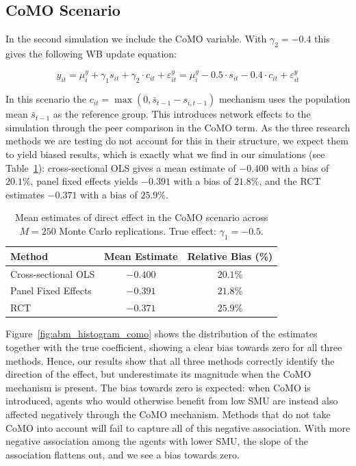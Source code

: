 \subsection{CoMO Scenario}

In the second simulation we include the CoMO variable. With $\gamma_2 = -0.4$ this gives the following WB update equation:

\begin{equation}
    y_{it} = \mu^y_i + \gamma_1 s_{it} + \gamma_2 \cdot c_{it} + \varepsilon^y_{it}
     = \mu^y_i - 0.5 \cdot s_{it} - 0.4 \cdot c_{it} + \varepsilon^y_{it}
    \label{eq:wb_como}
\end{equation}

In this scenario the $c_{it} = \max(0, \bar{s}_{t-1} - s_{i,t-1})$ mechanism uses the population mean $\bar{s}_{t-1}$ as the reference group. This introduces network effects to the simulation through the peer comparison in the CoMO term. As the three research methods we are testing do not account for this in their structure, we expect them to yield biased results, which is exactly what we find in our simulations (see Table~\ref{tab:abm_como}): cross-sectional OLS gives a mean estimate of $-0.400$ with a bias of $20.1\%$, panel fixed effects yields $-0.391$ with a bias of $21.8\%$, and the RCT estimates $-0.371$ with a bias of $25.9\%$.

\begin{table}[htbp]
\centering
\caption[Mean estimates of direct effect in the CoMO scenario]{Mean estimates of direct effect in the CoMO scenario across $M = 250$ Monte Carlo replications. True effect: $\gamma_1 = -0.5$.}
\label{tab:abm_como}
\begin{tabular}{lcc}
\toprule
Method & Mean Estimate & Relative Bias (\%) \\
\midrule
Cross-sectional OLS & $-0.400$ & $20.1\%$ \\
Panel Fixed Effects & $-0.391$ & $21.8\%$ \\
RCT & $-0.371$ & $25.9\%$ \\
\bottomrule
\end{tabular}
\end{table}

Figure~\ref{fig:abm_histogram_como} shows the distribution of the estimates together with the true coefficient, showing a clear bias towards zero for all three methods. Hence, our results show that all three methods correctly identify the direction of the effect, but underestimate its magnitude when the CoMO mechanism is present. The bias towards zero is expected: when CoMO is introduced, agents who would otherwise benefit from low SMU are instead also affected negatively through the CoMO mechanism. Methods that do not take CoMO into account will fail to capture all of this negative association. With more negative association among the agents with lower SMU, the slope of the association flattens out, and we see a bias towards zero.

